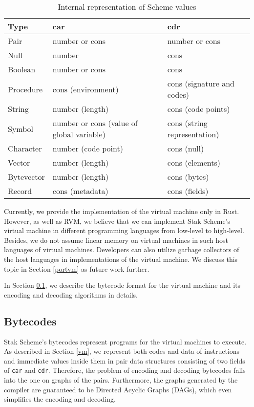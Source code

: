 \documentclass[sigplan, anonymous, review]{acmart}
\begin{document}
\begin{table*}
  \begin{center}
    \caption{Internal representation of Scheme values}
    \label{table:types}
    \begin{tabular}{lll}
      \hline
      Type & car & cdr \\
      \hline
      Pair & number or cons & number or cons \\
      Null & number & cons \\
      Boolean & number or cons & cons \\
      Procedure & cons (environment) & cons (signature and codes) \\
      String & number (length) & cons (code points) \\
      Symbol & number or cons (value of global variable) & cons
      (string representation) \\
      Character & number (code point) & cons (null) \\
      Vector & number (length) & cons (elements) \\
      Bytevector & number (length) & cons (bytes) \\
      Record & cons (metadata) & cons (fields) \\
      \hline
    \end{tabular}
  \end{center}
\end{table*}

Currently, we provide the implementation of the virtual machine only
in Rust.
However, as well as RVM, we believe that we can implement Stak Scheme's
virtual machine in different programming languages from low-level to high-level.
Besides, we do not assume linear memory on virtual machines in such
host languages of virtual machines.
Developers can also utilize garbage collectors of
the host languages in implementations of the virtual machine.
We discuss this topic in Section \ref{portvm} as future work further.

In Section \ref{bytecodes}, we describe the bytecode format for the
virtual machine and its encoding and decoding algorithms in details.

\subsection{Bytecodes} \label{bytecodes}

Stak Scheme's bytecodes represent programs for the virtual machines to
execute.
As described in Section \ref{vm},
we represent both codes and data of instructions and immediate
values inside them in pair data structures consisting of two fields of
\texttt{car} and \texttt{cdr}.
Therefore, the problem of encoding and decoding bytecodes falls into
the one on graphs of the pairs.
Furthermore, the graphs generated by the compiler are guaranteed to be
Directed Acyclic Graphs (DAGs), which even simplifies the encoding
and decoding.
\end{document}
